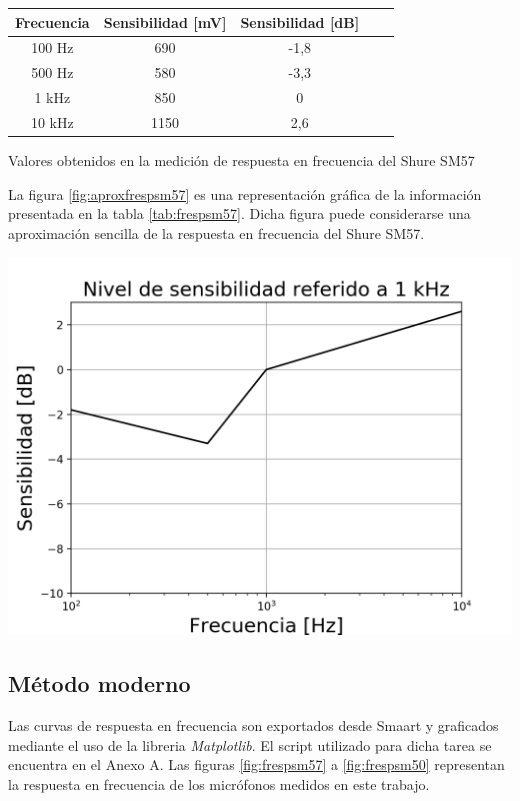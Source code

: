 \documentclass[]{article}
\makeatletter
\newenvironment{tablehere}    %
  {\def\@captype{table}}    %

  {}              %
\newenvironment{figurehere}   %
  {\def\@captype{figure}}   %
  {\par\medskip}
  {}              %
\makeatother
\begin{document}
\begin{multicols}{2}
\begin{tablehere}
\begin{center}
\begin{tabular}{|c|c|c|c|c|}
\hline
Frecuencia & Sensibilidad [mV] & Sensibilidad [dB] \\
\hline
100 Hz & 690    & -1,8 \\
500 Hz & 580    & -3,3 \\
1  kHz & 850    & 0    \\
10 kHz & 1150   & 2,6  \\
\hline
\end{tabular}
\caption{Valores obtenidos en la medición de respuesta en frecuencia del
Shure SM57}
\label{tab:frespsm57}
\end{center}
\end{tablehere}

La figura \ref{fig:aproxfrespsm57} es una representación gráfica de la información
presentada en la tabla \ref{tab:frespsm57}. Dicha figura puede considerarse una
aproximación sencilla de la respuesta en frecuencia del Shure SM57.

\begin{figurehere}
 \centering
 \includegraphics[width=\linewidth]{frespsm57}
 \label{fig:aproxfrespsm57}
\end{figurehere}


\subsection{Método moderno}
Las curvas de respuesta en frecuencia son exportados desde Smaart y graficados
mediante el uso de la libreria \textit{Matplotlib}.
El script utilizado para dicha tarea se encuentra en el Anexo A.
Las figuras \ref{fig:frespsm57} a \ref{fig:frespsm50} representan la respuesta
en frecuencia de los micrófonos medidos en este trabajo.


\end{multicols}
\end{document}
